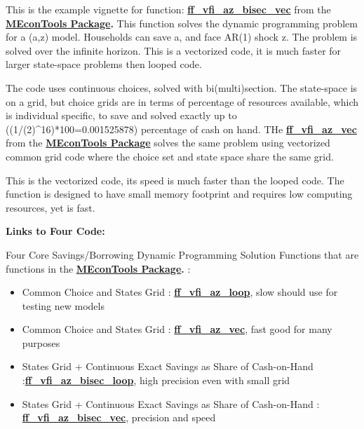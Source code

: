 \documentclass[
]{book}
\begin{document}
This is the example vignette for function:
\href{https://github.com/FanWangEcon/MEconTools/blob/master/MEconTools/vfi/ff_vfi_az_bisec_vec.m}{\textbf{ff\_vfi\_az\_bisec\_vec}}
from the \href{https://fanwangecon.github.io/MEconTools/}{\textbf{MEconTools
Package}}\textbf{.} This function
solves the dynamic programming problem for a (a,z) model. Households can
save a, and face AR(1) shock z. The problem is solved over the infinite
horizon. This is a vectorized code, it is much faster for larger
state-space problems then looped code.

The code uses continuous choices, solved with bi(multi)section. The
state-space is on a grid, but choice grids are in terms of percentage of
resources available, which is individual specific, to save and solved
exactly up to ((1/(2)\^{}16)*100=0.001525878) percentage of cash on hand.
THe
\href{https://github.com/FanWangEcon/MEconTools/blob/master/MEconTools/vfi/ff_vfi_az_vec.m}{\textbf{ff\_vfi\_az\_vec}}
from the \href{https://fanwangecon.github.io/MEconTools/}{\textbf{MEconTools
Package}} solves the same
problem using vectorized common grid code where the choice set and state
space share the same grid.

This is the vectorized code, its speed is much faster than the looped
code. The function is designed to have small memory footprint and
requires low computing resources, yet is fast.

\textbf{Links to Four Code:}

Four Core Savings/Borrowing Dynamic Programming Solution Functions that
are functions in the \href{https://fanwangecon.github.io/MEconTools/}{\textbf{MEconTools
Package}}\textbf{.} :

\begin{itemize}
\item
  Common Choice and States Grid :
  \href{https://github.com/FanWangEcon/MEconTools/blob/master/MEconTools/vfi/ff_vfi_az_loop.m}{\textbf{ff\_vfi\_az\_loop}},
  slow should use for testing new models
\item
  Common Choice and States Grid :
  \href{https://github.com/FanWangEcon/MEconTools/blob/master/MEconTools/vfi/ff_vfi_az_vec.m}{\textbf{ff\_vfi\_az\_vec}},
  fast good for many purposes
\item
  States Grid + Continuous Exact Savings as Share of Cash-on-Hand :\href{https://github.com/FanWangEcon/MEconTools/blob/master/MEconTools/vfi/ff_vfi_az_bisec_loop.m}{\textbf{ff\_vfi\_az\_bisec\_loop}},
  high precision even with small grid
\item
  States Grid + Continuous Exact Savings as Share of Cash-on-Hand :
  \href{https://github.com/FanWangEcon/MEconTools/blob/master/MEconTools/vfi/ff_vfi_az_bisec_vec.m}{\textbf{ff\_vfi\_az\_bisec\_vec}},
  precision and speed
\end{itemize}
\end{document}
